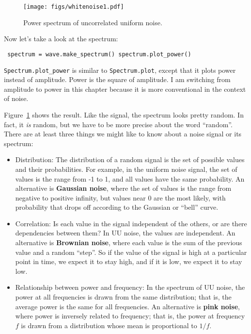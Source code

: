 \documentclass[12pt]{book} \usepackage[width=5.5in,height=8.5in, hmarginratio=3:2,vmarginratio=1:1]{geometry}
\begin{document}
\begin{figure} 

\centerline{\texttt{[image: figs/whitenoise1.pdf]}} \caption{Power spectrum of uncorrelated uniform noise.} \label{fig.whitenoise1} \end{figure} 

Now let's take a look at the spectrum: 

\begin{verbatim} spectrum = wave.make_spectrum() spectrum.plot_power() \end{verbatim} 

\verb"Spectrum.plot_power" is similar to \verb"Spectrum.plot", except that it plots power instead of amplitude. Power is the square of amplitude. I am switching from amplitude to power in this chapter because it is more conventional in the context of noise. 

Figure~\ref{fig.whitenoise1} shows the result. Like the signal, the spectrum looks pretty random. In fact, it {\em is} random, but we have to be more precise about the word ``random''. There are at least three things we might like to know about a noise signal or its spectrum: 

\begin{itemize} 

\item Distribution: The distribution of a random signal is the set of possible values and their probabilities. For example, in the uniform noise signal, the set of values is the range from -1 to 1, and all values have the same probability. An alternative is {\bf Gaussian noise}, where the set of values is the range from negative to positive infinity, but values near 0 are the most likely, with probability that drops off according to the Gaussian or ``bell'' curve. 

\item Correlation: Is each value in the signal independent of the others, or are there dependencies between them? In UU noise, the values are independent. An alternative is {\bf Brownian noise}, where each value is the sum of the previous value and a random ``step''. So if the value of the signal is high at a particular point in time, we expect it to stay high, and if it is low, we expect it to stay low. 

\item Relationship between power and frequency: In the spectrum of UU noise, the power at all frequencies is drawn from the same distribution; that is, the average power is the same for all frequencies. An alternative is {\bf pink noise}, where power is inversely related to frequency; that is, the power at frequency $f$ is drawn from a distribution whose mean is proportional to $1/f$. 

\end{itemize} 
\end{document}
